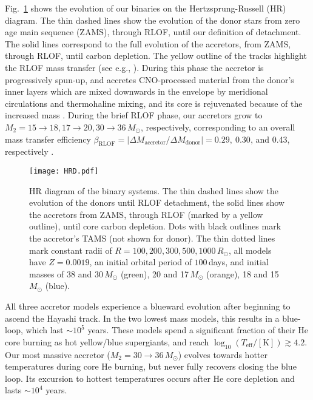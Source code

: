 \documentclass[twocolumn,twocolappendix,trackchanges]{aastex63}
\DeclareRobustCommand{\Figref}[1]{Fig.~\ref{#1}}
\begin{document}
\Figref{fig:HRD} shows the evolution of our binaries on the
Hertzsprung-Russell (HR) diagram. The thin dashed lines show the
evolution of the donor stars \citep[e.g.,][]{morton:60, gotberg:2018,
  laplace:2021} from zero age main sequence (ZAMS), through RLOF,
until our definition of detachment. The solid lines correspond to the
full evolution of the accretors, from ZAMS, through RLOF, until carbon
depletion. The yellow outline of the tracks highlight the RLOF mass
transfer (see e.g., \citealt{renzo:2021zoph}). During this phase the
accretor is progressively spun-up, and accretes CNO-processed material
from the donor's inner layers which are mixed downwards in the
envelope by meridional circulations and thermohaline mixing, and its
core is rejuvenated because of the increased mass \citep[see
also][]{sravan:2019, renzo:2021zoph, wang:2020}. During the brief RLOF
phase, our accretors grow to
$M_2=15\rightarrow 18, 17\rightarrow 20, 30\rightarrow 36\,M_\odot$,
respectively, corresponding to an overall mass transfer efficiency
$\beta_\mathrm{RLOF}=|\Delta M_\mathrm{accretor}/\Delta M_\mathrm{donor}| = 0.29,\ 0.30,$\,and
0.43, respectively \citep[see discussion in ][]{renzo:2021zoph}.

\begin{figure}[tbp]
  \texttt{[image: HRD.pdf]}
  \caption{HR diagram of the binary systems. The thin dashed lines
    show the evolution of the donors until RLOF detachment, the solid
    lines show the accretors from ZAMS, through RLOF (marked by a
    yellow outline), until core carbon depletion. Dots with black
    outlines mark the accretor's TAMS (not shown for donor). The thin
    dotted lines mark constant radii of
    $R=100, 200, 300, 500, 1000\,R_\odot$, all models have $Z=0.0019$,
    an initial orbital period of $100$\,days, and initial masses of 38
    and 30\,$M_\odot$ (green), 20 and 17\,$M_\odot$ (orange), 18 and
    15\,$M_\odot$ (blue).}
  \label{fig:HRD}
\end{figure}

All three accretor models experience a blueward evolution after
beginning to ascend the Hayashi track. In the two lowest mass models,
this results in a blue-loop, which last $\sim{}10^5$ years. These
models spend a significant fraction of their He core burning as hot
yellow/blue supergiants, and reach
$\log_{10}(T_\mathrm{eff}/\mathrm{[K]})\gtrsim 4.2$. Our most massive
accretor ($M_2=30\rightarrow 36\,M_\odot$) evolves towards hotter
temperatures during core He burning, but never fully recovers closing
the blue loop. Its excursion to hottest temperatures occurs after He
core depletion and lasts $\sim{}10^{4}$ years.
\end{document}
